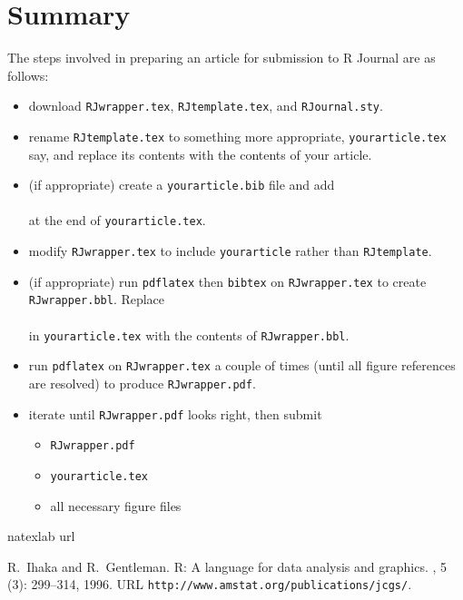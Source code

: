 \section*{Summary}

The steps involved in preparing an article for submission to R Journal
are as follows:

\begin{itemize}
\setlength{\itemsep}{0in}
\item download {\tt RJwrapper.tex}, {\tt RJtemplate.tex}, and {\tt RJournal.sty}.
\item rename {\tt RJtemplate.tex} to something more appropriate,
{\tt yourarticle.tex} say, and replace its
contents with the contents of your article.
\item (if appropriate) create a {\tt yourarticle.bib} file
and add \\
\verb||\\
at the end of {\tt yourarticle.tex}.
\item modify {\tt RJwrapper.tex} to include {\tt yourarticle} rather
than {\tt RJtemplate}.
\item (if appropriate) run {\tt pdflatex} then
 {\tt bibtex} on {\tt RJwrapper.tex}
to create {\tt RJwrapper.bbl}. Replace \\
\verb||\\
in {\tt yourarticle.tex} with
the contents of {\tt RJwrapper.bbl}.
\item run {\tt pdflatex} on {\tt RJwrapper.tex} a couple of times
(until all figure references are resolved) to produce {\tt RJwrapper.pdf}.
\item iterate until {\tt RJwrapper.pdf} looks right, then submit
  \begin{itemize}
  \item {\tt RJwrapper.pdf}
  \item {\tt yourarticle.tex}
  \item all necessary figure files
  \end{itemize}
\end{itemize}


\begin{thebibliography}{1}
\expandafter\ifx\csname natexlab\endcsname\relax\def\natexlab#1{#1}\fi
\expandafter\ifx\csname url\endcsname\relax
  \def\url#1{{\tt #1}}\fi

R.~Ihaka and R.~Gentleman.
\newblock R: A language for data analysis and graphics.
, 5
  (3): 299--314, 1996.
\newblock URL \url{http://www.amstat.org/publications/jcgs/}.

\end{thebibliography}
